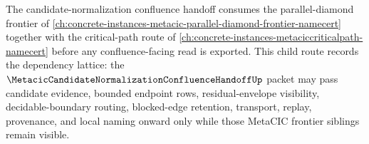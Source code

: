 The candidate-normalization confluence handoff consumes the parallel-diamond frontier of \autoref{ch:concrete-instances-metacic-parallel-diamond-frontier-namecert} together with the critical-path route of \autoref{ch:concrete-instances-metaciccriticalpath-namecert} before any confluence-facing read is exported. This child route records the dependency lattice: the $\MetacicCandidateNormalizationConfluenceHandoffUp$ packet may pass candidate evidence, bounded endpoint rows, residual-envelope visibility, decidable-boundary routing, blocked-edge retention, transport, replay, provenance, and local naming onward only while those MetaCIC frontier siblings remain visible.

